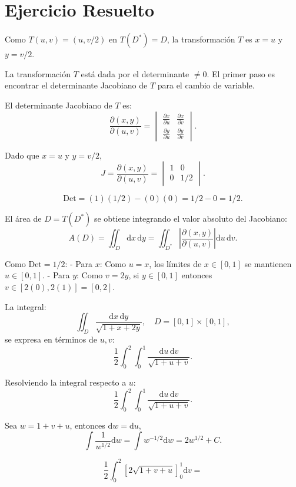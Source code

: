 \section*{Ejercicio Resuelto}

\begin{ejercicio}[title=Ejercicio 8]
Como \(T(u,v) = (u, v/2)\) en \(T(D^*) = D\), la transformación \(T\) es \(x = u\) y \(y = v/2\).

La transformación \(T\) está dada por el determinante \( \neq 0 \). El primer paso es encontrar el determinante Jacobiano de \(T\) para el cambio de variable.

El determinante Jacobiano de \(T\) es:
\[
\frac{\partial(x,y)}{\partial(u,v)} = 
\begin{vmatrix} 
\frac{\partial x}{\partial u} & \frac{\partial x}{\partial v} \\ 
\frac{\partial y}{\partial u} & \frac{\partial y}{\partial v} 
\end{vmatrix}.
\]

Dado que \(x = u\) y \(y = v/2\),
\[
J = \frac{\partial(x,y)}{\partial(u,v)} = 
\begin{vmatrix} 
1 & 0 \\ 
0 & 1/2 
\end{vmatrix}.
\]

\[
\text{Det} = (1)(1/2) - (0)(0) = 1/2 - 0 = 1/2.
\]

El área de \(D = T(D^*)\) se obtiene integrando el valor absoluto del Jacobiano:
\[
A(D) = \iint_D \mathrm{d}x \, \mathrm{d}y = \iint_{D^*} \left| \frac{\partial(x,y)}{\partial(u,v)} \right| \mathrm{d}u \, \mathrm{d}v.
\]

Como \(\text{Det} = 1/2\):
- Para \(x\): Como \(u = x\), los límites de \(x \in [0,1]\) se mantienen \(u \in [0,1]\).
- Para \(y\): Como \(v = 2y\), si \(y \in [0,1]\) entonces \(v \in [2(0), 2(1)] = [0,2]\).

La integral:
\[
\iint_D \frac{\mathrm{d}x \, \mathrm{d}y}{\sqrt{1+x+2y}}, \quad D = [0,1] \times [0,1],
\]
se expresa en términos de \(u, v\):
\[
\frac{1}{2} \int_0^2 \int_0^1 \frac{\mathrm{d}u \, \mathrm{d}v}{\sqrt{1+u+v}}.
\]

Resolviendo la integral respecto a \(u\):
\[
\frac{1}{2} \int_0^2 \int_0^1 \frac{\mathrm{d}u \, \mathrm{d}v}{\sqrt{1+u+v}}.
\]

Sea \(w = 1 + v + u\), entonces \(\mathrm{d}w = \mathrm{d}u\),
\[
\int \frac{1}{w^{1/2}} \mathrm{d}w = \int w^{-1/2} \mathrm{d}w = 2w^{1/2} + C.
\]

\[
\frac{1}{2} \int_0^2 \left[ 2\sqrt{1+v+u} \right]_0^1 \mathrm{d}v =
\]


\end{ejercicio}
